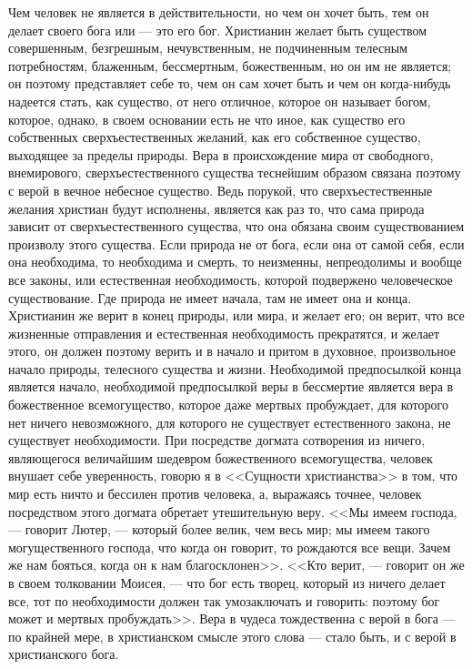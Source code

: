 \documentclass[12pt]{article}
\begin{document}
Чем человек не является в действительности, но чем он хочет быть, тем он делает своего бога или --- это его бог. Христианин желает быть существом совершенным, безгрешным, нечувственным, не подчиненным телесным потребностям, блаженным, бессмертным, божественным, но он им не является; он поэтому представляет себе то, чем он сам хочет быть и чем он когда-нибудь надеется стать, как существо, от него отличное, которое он называет богом, которое, однако, в своем основании есть не что иное, как существо его собственных сверхъестественных желаний, как его собственное существо, выходящее за пределы природы. Вера в происхождение мира от свободного, внемирового, сверхъестественного существа теснейшим образом связана поэтому с верой в вечное небесное существо. Ведь порукой, что сверхъестественные желания христиан будут исполнены, является как раз то, что сама природа зависит от сверхъестественного существа, что она обязана своим существованием произволу этого существа. Если природа не от бога, если она от самой себя, если она необходима, то необходима и смерть, то неизменны, непреодолимы и вообще все законы, или естественная необходимость, которой подвержено человеческое существование. Где природа не имеет начала, там не имеет она и конца. Христианин же верит в конец природы, или мира, и желает его; он верит, что все жизненные отправления и естественная необходимость прекратятся, и желает этого, он должен поэтому верить и в начало и притом в духовное, произвольное начало природы, телесного существа и жизни. Необходимой предпосылкой конца является начало, необходимой предпосылкой веры в бессмертие является вера в божественное всемогущество, которое даже мертвых пробуждает, для которого нет ничего невозможного, для которого не существует естественного закона, не существует необходимости. При посредстве догмата сотворения из ничего, являющегося величайшим шедевром божественного всемогущества, человек внушает себе уверенность, говорю я в <<Сущности христианства>> в том, что мир есть ничто и бессилен против человека, а, выражаясь точнее, человек посредством этого догмата обретает утешительную веру. <<Мы имеем господа, --- говорит Лютер, --- который более велик, чем весь мир; мы имеем такого могущественного господа, что когда он говорит, то рождаются все вещи. Зачем же нам бояться, когда он к нам благосклонен>>. <<Кто верит, --- говорит он же в своем толковании Моисея, --- что бог есть творец, который из ничего делает все, тот по необходимости должен так умозаключать и говорить: поэтому бог может и мертвых пробуждать>>. Вера в чудеса тождественна с верой в бога --- по крайней мере, в христианском смысле этого слова --- стало быть, и с верой в христианского бога. 
\end{document}
